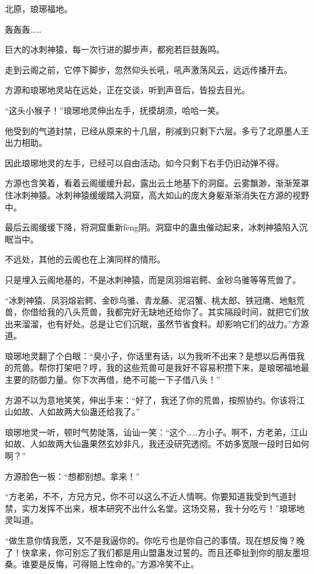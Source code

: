 
\begin{this_body}

北原，琅琊福地。

轰轰轰……

巨大的冰刺神猿，每一次行进的脚步声，都宛若巨鼓轰鸣。

走到云阁之前，它停下脚步，忽然仰头长吼，吼声激荡风云，远远传播开去。

方源和琅琊地灵站在远处，正在交谈，听到声音后，皆投去目光。

“这头小猴子！”琅琊地灵伸出左手，抚摸胡须，哈哈一笑。

他受到的气道封禁，已经从原来的十几层，削减到只剩下六层。多亏了北原墨人王出力相助。

因此琅琊地灵的左手，已经可以自由活动。如今只剩下右手仍旧动弹不得。

方源也含笑着，看着云阁缓缓升起，露出云土地基下的洞窟。云雾飘渺，渐渐笼罩住冰刺神猿。冰刺神猿缓缓踏入洞窟，高大如山的庞大身躯渐渐消失在方源的视野中。

最后云阁缓缓下降，将洞窟重新fēng阴。洞窟中的蛊虫催动起来，冰刺神猿陷入沉眠当中。

不远处，其他的云阁也在上演同样的情形。

只是埋入云阁地基的，不是冰刺神猿，而是凤羽熔岩鳄、金砂乌骓等等荒兽了。

“冰刺神猿、凤羽熔岩鳄、金砂乌骓、青龙藤、泥沼蟹、桃太郎、铁冠鹰、地魁荒兽，你借给我的八头荒兽，我都完好无缺地还给你了。其实隔段时间，就把它们放出来溜溜，也有好处。总是让它们沉眠，虽然节省食料。却影响它们的战力。”方源道。

琅琊地灵翻了个白眼：“臭小子，你话里有话，以为我听不出来？是想以后再借我的荒兽。帮你打架吧？哼，我的这些荒兽可是我好不容易积攒下来，是琅琊福地最主要的防御力量。你下次再借，绝不可能一下子借八头！”

方源不以为意地笑笑，伸出手来：“好了，我还了你的荒兽，按照协约。你该将江山如故、人如故两大仙蛊还给我了。”

琅琊地灵一听，顿时气势陡落，讪讪一笑：“这个……方小子。啊不，方老弟，江山如故、人如故两大仙蛊果然玄妙非凡，我还没研究透彻。不妨多宽限一段时日如何啊？”

方源脸色一板：“想都别想。拿来！”

“方老弟，不不，方兄方兄，你不可以这么不近人情啊。你要知道我受到气道封禁，实力发挥不出来，根本研究不出什么名堂。这场交易，我十分吃亏！”琅琊地灵叫道。

“做生意你情我愿，又不是我逼你的。你吃亏也是你自己的事情。现在想反悔？晚了！快拿来，你可别忘了我们都是用山盟蛊发过誓的。而且还牵扯到你的朋友墨坦桑。谁要是反悔，可得赔上性命的。”方源冷笑不止。


\end{this_body}
